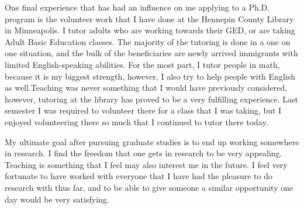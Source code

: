 \documentclass[a4paper,12pt]{article}
\begin{document}
One final experience that has had an influence on me applying to a Ph.D. program is the volunteer work that I have done at the Hennepin County Library in Minneapolis. I tutor adults who are working towards their GED, or are taking Adult Basic Education classes.  The majority of the tutoring is done in a one on one situation, and the bulk of the beneficiaries are newly arrived immigrants with limited English-speaking abilities.  For the most part, I tutor people in math, because it is my biggest strength, however, I also try to help people with English as well.Teaching was never something that I would have previously considered, however, tutoring at the library has proved to be a very fulfilling experience.  Last semester I was required to volunteer there for a class that I was taking, but I enjoyed volunteering there so much that I continued to tutor there today. 

My ultimate goal after pursuing graduate studies is to end up working somewhere in research.  I find the freedom that one gets in research to be very appealing.  Teaching is something that I feel may also interest me in the future.  I feel very fortunate to have worked with everyone that I have had the pleasure to do research with thus far, and to be able to give someone a similar opportunity one day would be very satisfying.
\end{document}
